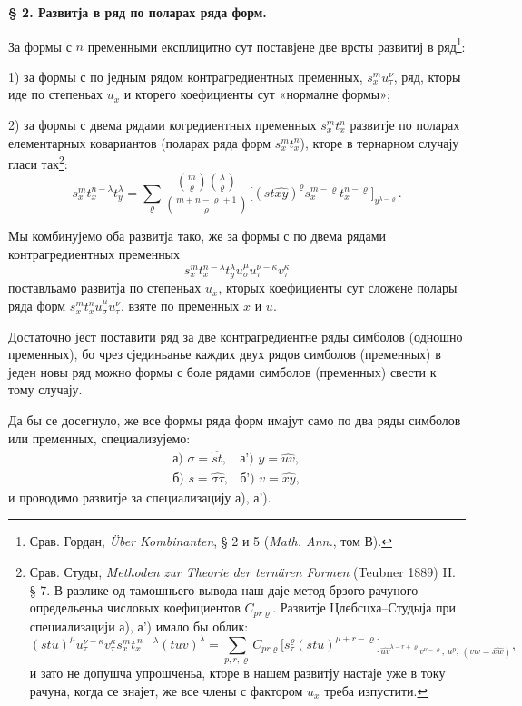 ﻿\documentclass[11pt]{article}
\begin{document}
\begin{center}
\textbf{§ 2. \quad Развитја в ряд по поларах ряда форм.}
\end{center}

За формы с $n$ пременными експлицитно сут поставјене две врсты развитиј в ряд\footnote{Срав. Гордан, \emph{Über Kombinanten}, § 2 и 5 (\emph{Math. Ann.}, том В).}:

1) за формы с по једным рядом контрагредиентных пременных, $s_x^m u_\tau^\nu$, ряд, кторы иде по степеньах $u_x$ и кторего коефициенты сут «нормалне формы»;

2) за формы с двема рядами когредиентных пременных $s_x^m t_x^n$ развитје по поларах елементарных ковариантов (поларах ряда форм $s_x^m t_x^n$), кторе в тернарном случају гласи так\footnote{Срав. Студы, \emph{Methoden zur Theorie der ternären Formen} (Teubner 1889) II. § 7. В разлике од тамошньего вывода наш даје метод брзого рачуного определьеньа числовых коефициентов $C_{pr\varrho}$. Развитје Цлебсцха--Студыја при специализацији а), а') имало бы облик:
\[
(stu)^\mu u_\tau^{\nu-\kappa}v_\tau^\kappa s_x^m t_x^{\,n-\lambda}(tuv)^\lambda
=\sum_{p,r,\varrho} C_{pr\varrho}
\bigl[s_\tau^\varrho(stu)^{\mu+r-\varrho}\bigr]_{\widehat{uv}^{\lambda-r+\varrho}v^{\nu-\varrho},\,u^p,\,(vw=\widehat{xw})},
\]
и зато не допушча упрошченьа, кторе в нашем развитју настаје уже в току рачуна, когда се знајет, же все члены с фактором $u_x$ треба изпустити.}:
\[
\tag{I}
s_x^m t_x^{n-\lambda}t_y^\lambda
=\sum_{\varrho}
\frac{\binom{m}{\varrho}\binom{\lambda}{\varrho}}
{\binom{m+n-\varrho+1}{\varrho}}
\bigl[(st\widehat{xy})^\varrho s_x^{m-\varrho}t_x^{n-\varrho}\bigr]_{y^{\lambda-\varrho}}.
\]

Мы комбинујемо оба развитја тако, же за формы с по двема рядами контрагредиентных пременных
\[
s_x^m t_x^{n-\lambda}t_y^\lambda u_\sigma^\mu u_\tau^{\nu-\kappa}v_\tau^\kappa
\]
поставльамо развитја по степеньах $u_x$, кторых коефициенты сут сложене полары ряда форм $s_x^m t_x^n u_\sigma^\mu u_\tau^\nu$, взяте по пременных $x$ и $u$.

Достаточно јест поставити ряд за две контрагредиентне ряды симболов (одношно пременных), бо чрез сјединьанье каждих двух рядов симболов (пременных) в једен новы ряд можно формы с боле рядами симболов (пременных) свести к тому случају.

Да бы се досегнуло, же все формы ряда форм имајут само по два ряды симболов или пременных, специализујемо:
\[
\begin{array}{ll}
\text{а) } \sigma=\widehat{st}, & \text{а') } y=\widehat{uv},\\[0.3em]
\text{б) } s=\widehat{\sigma\tau}, & \text{б') } v=\widehat{xy},
\end{array}
\]
и проводимо развитје за специализацију а), а').
\end{document}
